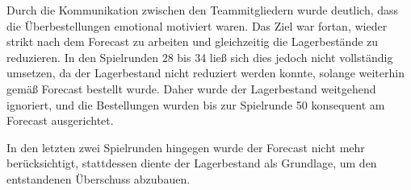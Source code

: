 \documentclass[a4paper,12pt]{article}
\begin{document}
Durch die Kommunikation zwischen den Teammitgliedern wurde deutlich, dass die Überbestellungen emotional motiviert waren.
Das Ziel war fortan, wieder strikt nach dem Forecast zu arbeiten und gleichzeitig die Lagerbestände zu reduzieren.
In den Spielrunden 28 bis 34 ließ sich dies jedoch nicht vollständig umsetzen, da der Lagerbestand nicht reduziert werden konnte, solange weiterhin gemäß Forecast bestellt wurde.
Daher wurde der Lagerbestand weitgehend ignoriert, und die Bestellungen wurden bis zur Spielrunde 50 konsequent am Forecast ausgerichtet.

In den letzten zwei Spielrunden hingegen wurde der Forecast nicht mehr berücksichtigt, stattdessen diente der Lagerbestand als Grundlage, um den entstandenen Überschuss abzubauen.
\end{document}
